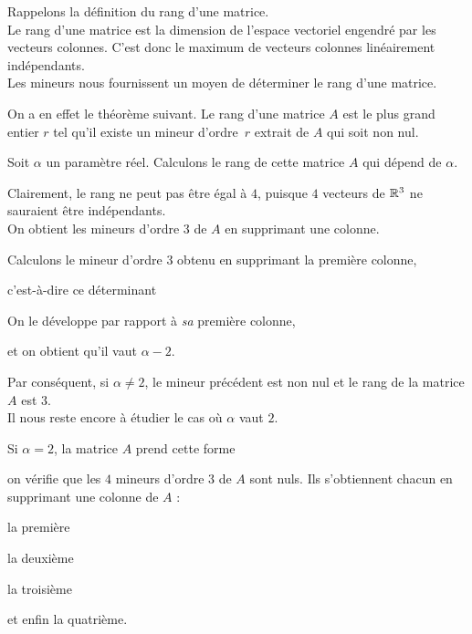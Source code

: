 \diapo
Rappelons la définition du rang d'une matrice. \\

Le rang d'une matrice est la dimension de l'espace vectoriel  engendré par les vecteurs colonnes. C'est donc le maximum de vecteurs colonnes linéairement indépendants. \\

Les mineurs nous fournissent un moyen de déterminer le rang d'une matrice.

\change
On a en effet le théorème suivant. Le rang d'une matrice $A$ est le plus grand entier $r$ 
tel qu'il existe un mineur d'ordre~$r$ extrait de $A$ qui soit non nul.


\diapo
Soit $\alpha$ un paramètre réel. Calculons le rang
de cette matrice $A$ qui dépend de $\alpha$.

\change
Clairement, le rang ne peut pas être égal à $4$, puisque $4$ vecteurs de $\mathbb{R}^3$ ne sauraient être indépendants.\\

On obtient les mineurs d'ordre $3$ de $A$ en supprimant une colonne. 

\change
Calculons le mineur d'ordre $3$ obtenu en supprimant la première colonne, 

\change
c'est-à-dire ce déterminant

\change
On le développe par rapport à \emph{sa} première colonne,
  
\change 
et on obtient qu'il vaut  $\alpha - 2$.

\change
Par conséquent, si $\alpha \neq 2$, le mineur précédent est non nul et le rang de la matrice $A$ est $3$.\\

Il nous reste encore à étudier le cas où $\alpha$ vaut $2$.


\diapo

Si $\alpha =2$, la matrice $A$ prend cette forme

\change
on vérifie que les $4$ mineurs d'ordre $3$ de $A$ sont nuls. Ils s'obtiennent chacun en supprimant une colonne de $A$ :

\change
la première

\change
la deuxième

\change
la troisième

\change
et enfin la quatrième.

